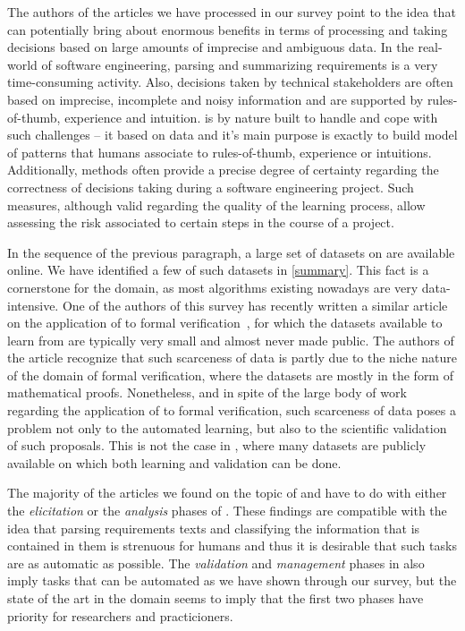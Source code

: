 The authors of the articles we have processed in our survey point
to the idea that \ML can potentially bring about enormous benefits in terms of
processing and taking decisions based on  large amounts of imprecise and
ambiguous data. In the real-world of software
engineering, parsing and summarizing requirements is a very time-consuming
activity. Also, decisions taken by technical stakeholders are often based on imprecise,
incomplete and noisy information and are supported by rules-of-thumb, experience
and intuition. \ML is by nature built to handle and cope with such challenges
-- it based on data and it's main purpose is exactly to build model of patterns
that humans associate to rules-of-thumb, experience or intuitions. Additionally,
\ML methods often provide a precise degree of certainty regarding the
correctness of decisions taking during a software engineering project. Such
measures, although valid regarding the quality of the learning process, allow
assessing the risk associated to certain steps in the course of a project.

In the sequence of the previous paragraph, a large set of datasets
on \RE are available online. We have identified a few of such datasets in
\tab \ref{summary}. This fact is a cornerstone for the domain, as most \ML
algorithms existing nowadays are very data-intensive. One of the authors of this
survey has recently written a similar article on the application of \ML to
formal verification~\cite{AmLuBi:2018}, for which the datasets available
to learn from are typically very small and almost never made public. The authors
of the article recognize that such scarceness of data is partly due to the niche
nature of the domain of formal verification, where the datasets are mostly in
the form of mathematical proofs. Nonetheless, and in spite of the large body of
work regarding the application of \ML to formal verification, such scarceness of
data poses a problem not only to the automated learning, but also to the
scientific validation of such proposals. This is not the case in \RE, where many
datasets are publicly available on which both learning and validation can be
done.

The majority of the articles we found on the topic of \ML and \RE have to do
with either the \emph{elicitation} or the \emph{analysis} phases of \RE. These
findings are compatible with the idea that parsing requirements texts and
classifying the information that is contained in them is strenuous for humans
and thus it is desirable that such tasks are as automatic as possible. The
\emph{validation} and \emph{management} phases in \RE also imply tasks that can
be automated as we have shown through our survey, but the state of the art in
the domain seems to imply that the first two phases have priority for
researchers and practicioners.


